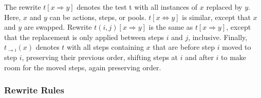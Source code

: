 The rewrite $t[x \Rightarrow y]$ denotes the test t with all instances of $x$
replaced by $y$.  Here, $x$ and $y$ can be actions, steps, or pools.
$t[x \Leftrightarrow y]$ is similar, except that $x$ and $y$ are
swapped.  Rewrite $t(i,j)[x \Rightarrow y]$ is the same as $t[x \Rightarrow
y]$, except that the replacement is only applied between steps $i$ and
$j$, inclusive.  Finally, $t_{\rightarrow i}(x)$ denotes $t$ with all steps
containing $x$ that are before step $i$ moved to step $i$, preserving
their previous order, shifting steps at $i$ and after $i$ to make room for
the moved steps, again preserving order.

\subsubsection{Rewrite Rules}

